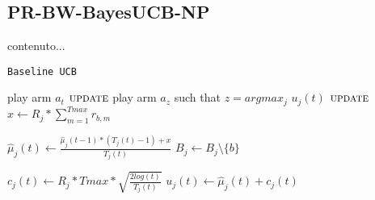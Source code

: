 \subsection{PR-BW-BayesUCB-NP}

























































\iffalse
	contenuto...




\begin{algorithm}[!h]
	\caption{\texttt{Baseline UCB}}
	\begin{scriptsize}
		\begin{algorithmic}[1]
			
			
			\Statex
			 
				\State play arm $a_t$\;
				\State $\textsc{update}$
			\EndFor
			 
				\State play arm $a_z$ such that  $z = argmax_j$ $u_j (t)$\;
				\State $\textsc{update}$
			\EndFor
			\EndFunction
			\Statex
						\State$x \gets   R_j * \sum_{m=1}^{Tmax}r_{b,m} $\;
						
						\State$\hat{\mu}_j(t) \gets \frac{\hat{\mu}_j(t-1)*(T_j(t)-1)+x}{T_j(t)}$\;
						\State$B_j \gets B_j \setminus \{b\}$\;	
										
					\EndIf				
				\EndFor			
				
			\State$c_j(t)\gets R_j * Tmax * \sqrt{\frac{2log(t)}{T_j(t)}}$\;
			\State$u_j(t) \gets  \hat{\mu}_j(t) +  c_j(t)$
			\EndFor
			
			
			
			
			\EndFunction
			
		\end{algorithmic}
	\end{scriptsize}
	\label{alg:BaselineUCB}
\end{algorithm}


